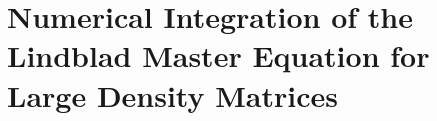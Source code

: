 \chapter[Numerical Integration of the Lindblad Master Equation]
  {Numerical Integration of the \\ Lindblad Master Equation for \\Large 
  Density Matrices}
  \label{apx:ob_eqns}
